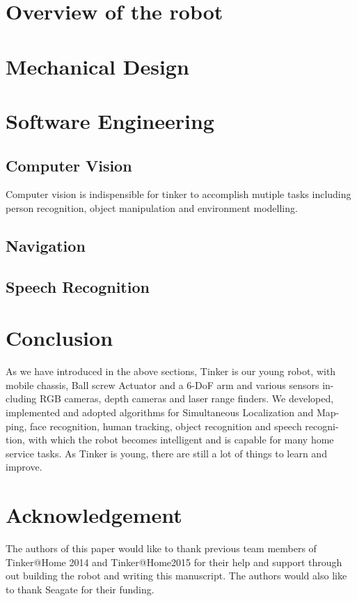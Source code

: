 \documentclass[runningheads,a4paper]{llncs}
\begin{document}
\section{Overview of the robot}



\section{Mechanical Design}


\section{Software Engineering}
\subsection{Computer Vision}
Computer vision is indispensible for tinker to accomplish mutiple tasks including person recognition, object manipulation and environment modelling.


\subsection{Navigation}


\subsection{Speech Recognition}




\section{Conclusion}

As we have introduced in the above sections, Tinker is our young robot, with mobile chassis, Ball screw Actuator and a 6-DoF arm and various sensors in- cluding RGB cameras, depth cameras and laser range finders. We developed, implemented and adopted algorithms for Simultaneous Localization and Map- ping, face recognition, human tracking, object recognition and speech recogni- tion, with which the robot becomes intelligent and is capable for many home service tasks. As Tinker is young, there are still a lot of things to learn and improve.


\section*{Acknowledgement}
The authors of this paper would like to thank previous team members of Tinker@Home 2014 and Tinker@Home2015 for their help and support through out building the robot and writing this manuscript. The authors would also like to thank Seagate for their funding. 



\end{document}
